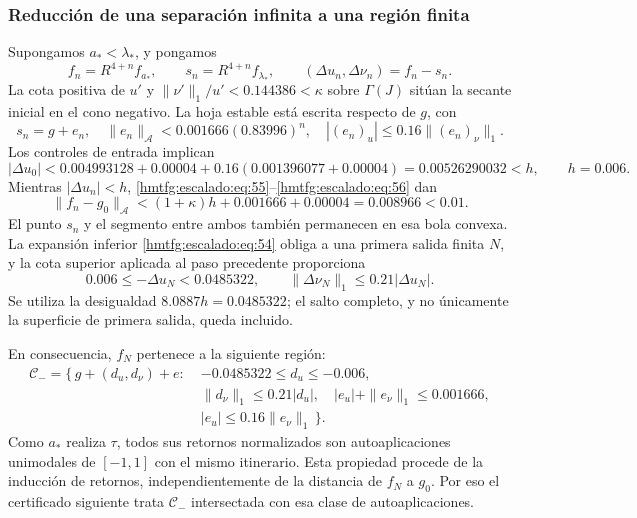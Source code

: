 \subsubsection{Reducción de una separación infinita a una región finita}
\label{hmtfg:escalado:16.2}

Supongamos \(a_*<\lambda_*\), y pongamos
\[
f_n=R^{4+n}f_{a_*},\qquad
s_n=R^{4+n}f_{\lambda_*},\qquad
(\Delta u_n,\Delta\nu_n)=f_n-s_n.
\]
La cota positiva de \(u'\) y \(\|\nu'\|_1/u'<0.144386<\kappa\) sobre \(\Gamma(J)\) sitúan la secante inicial en el cono negativo. La hoja estable está escrita respecto de \(g\), con
\begin{equation}
s_n=g+e_n,\quad
\|e_n\|_{\mathcal A}<0.001666(0.83996)^n,\quad
|(e_n)_u|\le0.16\|(e_n)_\nu\|_1.
\label{hmtfg:escalado:eq:56}
\end{equation}
Los controles de entrada implican
\begin{equation}
|\Delta u_0|
<0.004993128+0.00004
 +0.16(0.001396077+0.00004)
=0.00526290032< h,\qquad h=0.006.
\label{hmtfg:escalado:eq:57}
\end{equation}
Mientras \(|\Delta u_n|<h\), \eqref{hmtfg:escalado:eq:55}–\eqref{hmtfg:escalado:eq:56} dan
\begin{equation}
\|f_n-g_0\|_{\mathcal A}
<(1+\kappa)h+0.001666+0.00004
=0.008966<0.01.
\label{hmtfg:escalado:eq:58}
\end{equation}
El punto \(s_n\) y el segmento entre ambos también permanecen en esa bola convexa. La expansión inferior \eqref{hmtfg:escalado:eq:54} obliga a una primera salida finita \(N\), y la cota superior aplicada al paso precedente proporciona
\begin{equation}
0.006\le-\Delta u_N<0.0485322,\qquad
\|\Delta\nu_N\|_1\le0.21|\Delta u_N|.
\label{hmtfg:escalado:eq:59}
\end{equation}
Se utiliza la desigualdad \(8.0887h=0.0485322\); el salto completo, y no únicamente la superficie de primera salida, queda incluido.

En consecuencia, \(f_N\) pertenece a la siguiente región:
\begin{equation}
\begin{split}
\mathcal C_-=\{\,g+(d_u,d_\nu)+e:\;&
-0.0485322\le d_u\le-0.006,\\
&\|d_\nu\|_1\le0.21|d_u|,\quad
|e_u|+\|e_\nu\|_1\le0.001666,\\
&|e_u|\le0.16\|e_\nu\|_1\,\}.
\end{split}
\label{hmtfg:escalado:eq:60}
\end{equation}
Como \(a_*\) realiza \(\tau\), todos sus retornos normalizados son autoaplicaciones unimodales de \([-1,1]\) con el mismo itinerario. Esta propiedad procede de la inducción de retornos, independientemente de la distancia de \(f_N\) a \(g_0\). Por eso el certificado siguiente trata \(\mathcal C_-\) intersectada con esa clase de autoaplicaciones.

